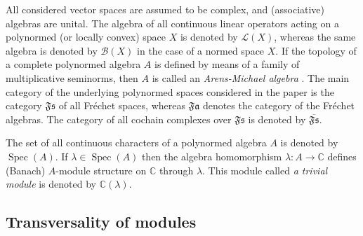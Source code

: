 \documentclass[12pt]{amsart}%
\theoremstyle{plain}
\numberwithin{equation}{section}
\numberwithin{equation}{section}
\numberwithin{theorem}{section}
\numberwithin{lemma}{section}
\numberwithin{remark}{section}
\numberwithin{example}{section}
\numberwithin{proposition}{section}
\numberwithin{definition}{section}
\numberwithin{corollary}{section}
\begin{document}
All considered vector spaces are assumed to be complex, and (associative)
algebras are unital. The algebra of all continuous linear operators acting on
a polynormed (or locally convex) space $X$ is denoted by $\mathcal{L}\left(
X\right)  $, whereas the same algebra is denoted by $\mathcal{B}\left(
X\right)  $ in the case of a normed space $X$. If the topology of a complete
polynormed algebra $A$ is defined by means of a family of multiplicative
seminorms, then $A$ is called an \textit{Arens-Michael algebra} \cite[1.2.4]%
{Hel}. The main category of the underlying polynormed spaces considered in the
paper is the category $\mathfrak{Fs}$ of all Fr\'{e}chet spaces, whereas
$\mathfrak{Fa}$ denotes the category of the Fr\'{e}chet algebras. The category
of all cochain complexes over $\mathfrak{Fs}$ is denoted by $\overline
{\mathfrak{Fs}}$.

The set of all continuous characters of a polynormed algebra $A$ is denoted by
$\operatorname{Spec}\left(  A\right)  $. If $\lambda\in\operatorname{Spec}%
\left(  A\right)  $ then the algebra homomorphism $\lambda:A\rightarrow
\mathbb{C}$ defines (Banach) $A$-module structure on $\mathbb{C}$ through
$\lambda$. This module called \textit{a trivial module} is denoted by
$\mathbb{C}\left(  \lambda\right)  $.

\subsection{Transversality of modules\label{subsecTrans}}
\end{document}
